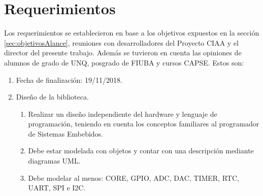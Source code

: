 \section{Requerimientos}
\label{sec:requerimientos}

Los requerimientos se establecieron en base a los objetivos expuestos en la sección \ref{sec:objetivosAlance}, reuniones con desarrolladores del Proyecto CIAA y el director del presente trabajo. Además se tuvieron en cuenta las opiniones de alumnos de grado de UNQ, posgrado de FIUBA y cursos CAPSE. Estos son:

\begin{enumerate}
\item Fecha de finalización: 19/11/2018.
\item Diseño de la biblioteca.
\begin{enumerate}%
\item Realizar un diseño independiente del hardware y lenguaje de programación, teniendo en cuenta los conceptos familiares al programador de Sistemas Embebidos.
\item Debe estar modelada con objetos y contar con una descripción mediante diagramas UML.
\item Debe modelar al menos: CORE, GPIO, ADC, DAC, TIMER, RTC, UART, SPI e I2C.
\end{enumerate}

\end{enumerate}
